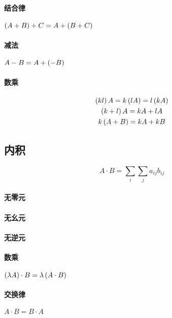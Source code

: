 \documentclass{article}
\begin{document}
\paragraph{结合律}$\left(A+B\right)+C=A+\left(B+C\right)$

\paragraph{减法}$A-B=A+\left(-B\right)$

\paragraph{数乘}

\[\begin{gathered}
        \left(kl\right)A=k\left(lA\right)=l\left(kA\right)\\
        \left(k+l\right)A=kA+lA\\
        k\left(A+B\right)=kA+kB
    \end{gathered}\]

\subsection{内积\label{InnerProduct}}

\begin{definition}
    \[A\cdot B=\sum_i\sum_ja_{ij}b_{ij}\]
\end{definition}

\paragraph{无零元}

\paragraph{无幺元}

\paragraph{无逆元}

\paragraph{数乘}$\left(\lambda A\right)\cdot B=\lambda\left(A\cdot B\right)$

\paragraph{交换律}$A\cdot B=B\cdot A$
\end{document}
